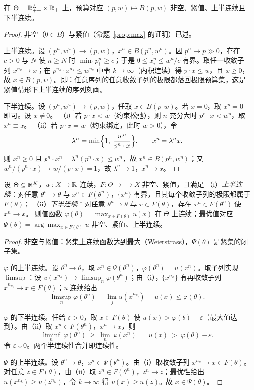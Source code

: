 \begin{lemma}[预算对应的连续性]
\label{lem:budget}
在 $\Theta=\mathbb{R}^L_{++}\times\mathbb{R}_+$ 上，预算对应 $(p,w)\mapsto B(p,w)$ 非空、紧值、上半连续且下半连续。
\end{lemma}
\begin{proof}
非空（$0\in B$）与紧值（命题~\ref{prop:max} 的证明）已述。

上半连续。设 $(p^n,w^n)\to(p,w)$，$x^n\in B(p^n,w^n)$。因 $p^n\to p\gg0$，存在 $c>0$ 与 $N$ 使 $n\ge N$ 时 $\min_i p^n_i\ge c$；于是 $0\le x^n_i\le w^n/c$ 有界。取任一收敛子列 $x^{n_k}\to x$；在 $p^{n_k}\cdot x^{n_k}\le w^{n_k}$ 中令 $k\to\infty$（内积连续）得 $p\cdot x\le w$，且 $x\ge0$，故 $x\in B(p,w)$。即：任意序列的任意收敛子列的极限都落回极限预算集，这是紧值情形下上半连续的序列刻画。

下半连续。设 $(p^n,w^n)\to(p,w)$，任取 $x\in B(p,w)$。若 $x=0$，取 $x^n=0$ 即可。设 $x\ne0$。
（i）若 $p\cdot x<w$（约束松弛），则 $n$ 充分大时 $p^n\cdot x<w^n$，取 $x^n\equiv x$。
（ii）若 $p\cdot x=w$（约束绑定，此时 $w>0$），令
\[
\lambda^n=\min\Bigl\{1,\ \frac{w^n}{p^n\cdot x}\Bigr\},\qquad x^n=\lambda^n x .
\]
则 $x^n\ge0$ 且 $p^n\cdot x^n=\lambda^n(p^n\cdot x)\le w^n$，故 $x^n\in B(p^n,w^n)$；又 $w^n/(p^n\cdot x)\to w/(p\cdot x)=1$，故 $\lambda^n\to1$，$x^n\to x$。
\end{proof}

\begin{theorem}
\label{thm:berge}
设 $\Theta\subseteq\mathbb{R}^K$，$u:X\to\mathbb{R}$ 连续，$F:\Theta\to\to X$ 非空、紧值，且满足
（i）\emph{上半连续}：对任意 $\theta^n\to\theta$ 与 $x^n\in F(\theta^n)$，$\{x^n\}$ 有界，且其每个收敛子列的极限都属于 $F(\theta)$；
（ii）\emph{下半连续}：对任意 $\theta^n\to\theta$ 与 $x\in F(\theta)$，存在 $x^n\in F(\theta^n)$ 使 $x^n\to x$。
则值函数 $\varphi(\theta)=\max_{x\in F(\theta)}u(x)$ 在 $\Theta$ 上连续；最优值对应 $\Psi(\theta)=\arg\max_{x\in F(\theta)}u$ 非空、紧值、上半连续。
\end{theorem}
\begin{proof}
非空与紧值：紧集上连续函数达到最大（Weierstrass），$\Psi(\theta)$ 是紧集的闭子集。

$\varphi$ 的上半连续。设 $\theta^n\to\theta$，取 $x^n\in\Psi(\theta^n)$，$\varphi(\theta^n)=u(x^n)$。取子列实现 $\limsup$：设 $u(x^{n_k})\to\limsup_n\varphi(\theta^n)$；由（i），$\{x^{n_k}\}$ 有再收敛子列 $x^{n_{k_j}}\to x\in F(\theta)$；$u$ 连续给出
\[
\limsup_n\varphi(\theta^n)=\lim_j u(x^{n_{k_j}})=u(x)\le\varphi(\theta).
\]

$\varphi$ 的下半连续。任给 $\varepsilon>0$，取 $x\in F(\theta)$ 使 $u(x)>\varphi(\theta)-\varepsilon$（最大值达到）。由（ii）取 $x^n\in F(\theta^n)$，$x^n\to x$，则
\[
\liminf_n\ \varphi(\theta^n)\ \ge\ \lim_n\ u(x^n)\ =\ u(x)\ >\ \varphi(\theta)-\varepsilon .
\]
令 $\varepsilon\downarrow0$。两个半连续性合并即连续性。

$\Psi$ 的上半连续。设 $\theta^n\to\theta$，$x^n\in\Psi(\theta^n)$。由（i）取收敛子列 $x^{n_k}\to x\in F(\theta)$。对任意 $z\in F(\theta)$，由（ii）取 $z^n\in F(\theta^n)$，$z^n\to z$；最优性给出 $u(x^{n_k})\ge u(z^{n_k})$，令 $k\to\infty$ 得 $u(x)\ge u(z)$。故 $x\in\Psi(\theta)$。
\end{proof}

